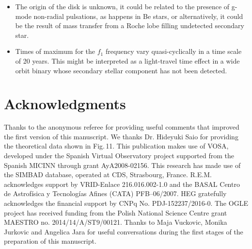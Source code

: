 \documentclass[useAMS,usenatbib]{mn2e}
\begin{document}
\begin{itemize}
\item The origin of the disk is unknown, it could be related to the presence of g-mode non-radial pulsations, as happens in Be stars, or alternatively, it could be the result of mass transfer from a Roche lobe filling undetected secondary star.

\item Times of maximum for the $f_1$ frequency vary quasi-cyclically in a time scale of 20 years. This might be interpreted as a light-travel time effect in a wide orbit binary whose secondary stellar component has not been detected.


\end{itemize}




\section{Acknowledgments}

 Thanks to the anonymous referee for providing useful comments that improved the first version of this manuscript.
We thanks Dr. Hideyuki Saio for providing the theoretical data shown in Fig.\,11. This publication makes use of  VOSA, developed under the Spanish Virtual Observatory project supported from the Spanish MICINN through grant AyA2008-02156.
This research has made use of the SIMBAD database, operated at CDS, Strasbourg, France.
R.E.M. acknowledges support by VRID-Enlace 216.016.002-1.0 and the BASAL Centro de Astrof{\'{i}}sica y Tecnolog{\'{i}}as Afines (CATA) PFB--06/2007. 
HEG gratefully acknowledges the financial support by CNPq No. PDJ-152237/2016-0.
The OGLE project has received funding from the Polish National Science
Centre grant MAESTRO no. 2014/14/A/ST9/00121. Thanks to Maja Vuckovic, Monika  Jurkovic and Angelica Jara for  useful conversations during the first stages of the preparation of this manuscript.
\end{document}
